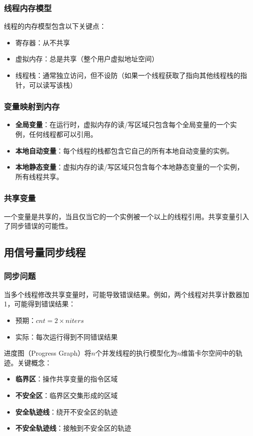 \subsubsection{线程内存模型}
线程的内存模型包含以下关键点：
\begin{itemize}
    \item 寄存器：从不共享
    \item 虚拟内存：总是共享（整个用户虚拟地址空间）
    \item 线程栈：通常独立访问，但不设防（如果一个线程获取了指向其他线程栈的指针，可以读写该栈）
\end{itemize}

\subsubsection{变量映射到内存}
\begin{itemize}
    \item \textbf{全局变量}：在运行时，虚拟内存的读/写区域只包含每个全局变量的一个实例，任何线程都可以引用。
    \item \textbf{本地自动变量}：每个线程的栈都包含它自己的所有本地自动变量的实例。
    \item \textbf{本地静态变量}：虚拟内存的读/写区域只包含每个本地静态变量的一个实例，所有线程共享。
\end{itemize}

\subsubsection{共享变量}
一个变量是共享的，当且仅当它的一个实例被一个以上的线程引用。共享变量引入了同步错误的可能性。

\subsection{用信号量同步线程}

\subsubsection{同步问题}
当多个线程修改共享变量时，可能导致错误结果。例如，两个线程对共享计数器加1，可能得到错误结果：
\begin{itemize}
    \item 预期：$cnt = 2 \times niters$
    \item 实际：每次运行得到不同错误结果
\end{itemize}

进度图（Progress Graph）将$n$个并发线程的执行模型化为$n$维笛卡尔空间中的轨迹。关键概念：
\begin{itemize}
    \item \textbf{临界区}：操作共享变量的指令区域
    \item \textbf{不安全区}：临界区交集形成的区域
    \item \textbf{安全轨迹线}：绕开不安全区的轨迹
    \item \textbf{不安全轨迹线}：接触到不安全区的轨迹
\end{itemize}

